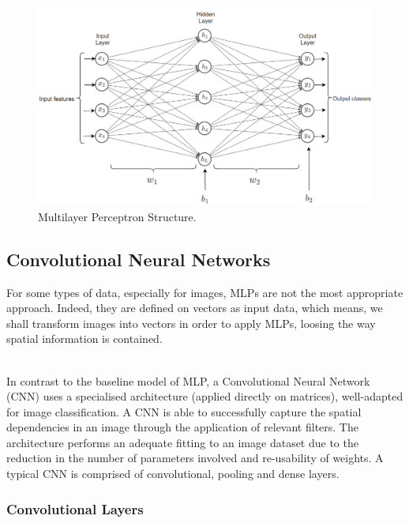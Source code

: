 \begin{figure}[H]
  \centering
  \includegraphics[scale = 0.5]{Images/mlp.png}
  \caption{Multilayer Perceptron Structure.}
  \label{Multilayer Perceptron}
\end{figure}

\subsection{Convolutional Neural Networks}

For some types of data, especially for images, MLPs are not the most appropriate approach. Indeed, they are defined on vectors as input data, which means, we shall transform images into vectors in order to apply MLPs, loosing the way spatial information is contained. \\\

In contrast to the baseline model of MLP, a Convolutional Neural Network (CNN) uses a specialised architecture (applied directly on matrices), well-adapted for image classification. A CNN is able to successfully capture the spatial dependencies in an image through the application of relevant filters. The architecture performs an adequate fitting to an image dataset due to the reduction in the number of parameters involved and re-usability of weights. A typical CNN is comprised of convolutional, pooling and dense layers. \\

\subsubsection*{Convolutional Layers}


